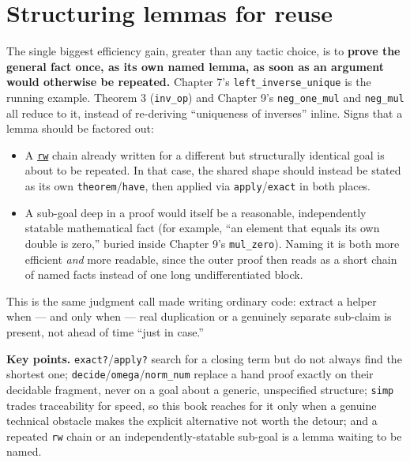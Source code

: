 \section{Structuring lemmas for reuse}\label{sec:12-working-efficiently:05-structuring-lemmas:1}

The single biggest efficiency gain, greater than any tactic choice, is to \textbf{prove the general fact once, as its own named lemma, as soon as an argument would otherwise be repeated.} Chapter 7's \texttt{left\_\allowbreak{}inverse\_\allowbreak{}unique} is the running example. Theorem 3 (\texttt{inv\_\allowbreak{}op}) and Chapter 9's \texttt{neg\_\allowbreak{}one\_\allowbreak{}mul} and \texttt{neg\_\allowbreak{}mul} all reduce to it, instead of re-deriving ``uniqueness of inverses'' inline. Signs that a lemma should be factored out:

\begin{itemize}
\tightlist
\item
  A \href{https://lean-lang.org/doc/reference/latest/Tactic-Proofs/Tactic-Reference/}{\texttt{rw}} chain already written for a different but structurally identical goal is about to be repeated. In that case, the shared shape should instead be stated as its own \texttt{theorem}/\texttt{have}, then applied via \texttt{apply}/\texttt{exact} in both places.
\item
  A sub-goal deep in a proof would itself be a reasonable, independently statable mathematical fact (for example, ``an element that equals its own double is zero,'' buried inside Chapter 9's \texttt{mul\_\allowbreak{}zero}). Naming it is both more efficient \emph{and} more readable, since the outer proof then reads as a short chain of named facts instead of one long undifferentiated block.
\end{itemize}

This is the same judgment call made writing ordinary code: extract a helper when --- and only when --- real duplication or a genuinely separate sub-claim is present, not ahead of time ``just in case.''

\textbf{Key points.} \texttt{exact?}/\texttt{apply?} search for a closing term but do not always find the shortest one; \texttt{decide}/\texttt{omega}/\texttt{norm\_\allowbreak{}num} replace a hand proof exactly on their decidable fragment, never on a goal about a generic, unspecified structure; \texttt{simp} trades traceability for speed, so this book reaches for it only when a genuine technical obstacle makes the explicit alternative not worth the detour; and a repeated \texttt{rw} chain or an independently-statable sub-goal is a lemma waiting to be named.

